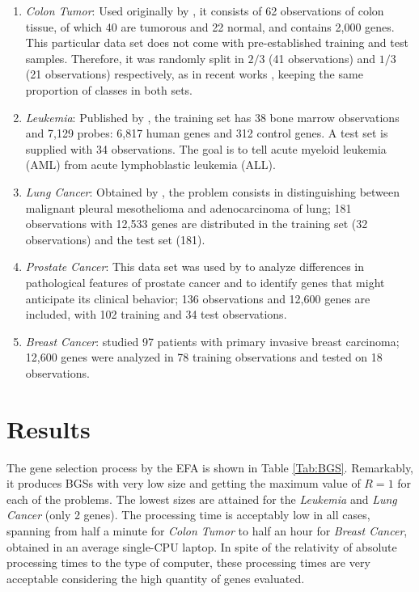 \documentclass{article}
\begin{document}
\begin{enumerate}
\item \emph{Colon Tumor}: Used originally by
  \cite{Al99}, it consists of 62 observations of colon tissue, of
  which 40 are tumorous and 22 normal, and contains 2,000 genes. This
  particular data set does not come with pre-established training and
  test samples. Therefore, it was randomly split in $2/3$ (41
  observations) and $1/3$ (21 observations) respectively, as in recent
  works \cite{Bu07, Tod04}, keeping the same proportion of
  classes in both sets.
\item \emph{Leukemia}: Published by \cite{Go99}, the
  training set has 38 bone marrow observations and 7,129 probes:
  6,817 human genes and 312 control genes. A test set is supplied with
  34 observations. The goal is to tell acute myeloid leukemia
  (AML) from acute lymphoblastic leukemia (ALL).
\item \emph{Lung Cancer}: Obtained by \cite{Gor02}, the
  problem consists in distinguishing between malignant pleural mesothelioma
  and adenocarcinoma of lung; 181 observations with 12,533 genes are
  distributed in the training set (32 observations) and the test set (181).
\item \emph{Prostate Cancer}: This data set was used by
  \cite{Sig02} to analyze differences in pathological features of
  prostate cancer and to identify genes that might anticipate its
  clinical behavior; 136 observations and 12,600 genes are included,
  with 102 training and 34 test observations.
\item \emph{Breast Cancer}: \cite{Ver02} studied 97
  patients with primary invasive breast carcinoma; 12,600 genes were
  analyzed in 78 training observations and tested on 18 observations.
\end{enumerate}




\section{Results}
The gene selection process by the EFA is shown in Table \ref{Tab:BGS}.
Remarkably, it produces BGSs with very low size and getting
the maximum value of $R=1$ for each of the problems.  The lowest sizes
are attained for the \emph{Leukemia} and \emph{Lung Cancer} (only 2
genes).  The processing time is acceptably low in all cases, spanning
from half a minute for \emph{Colon Tumor} to half an hour for
\emph{Breast Cancer}, obtained in an average single-CPU laptop. In
spite of the relativity of absolute processing times to the type of
computer, these processing times are very acceptable considering the
high quantity of genes evaluated.
\end{document}
